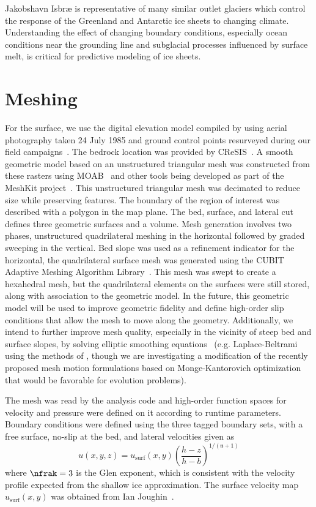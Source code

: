 Jakobshavn Isbr{\ae} is representative of many similar outlet glaciers which control the response of the Greenland and Antarctic ice sheets to changing climate.
Understanding the effect of changing boundary conditions, especially ocean conditions near the grounding line and subglacial processes influenced by surface melt, is critical for predictive modeling of ice sheets.


\section{Meshing}
For the surface, we use the digital elevation model compiled by \cite{motyka2010volume} using aerial photography taken 24 July 1985 and ground control points resurveyed during our field campaigns~.
The bedrock location was provided by CReSIS~.
A smooth geometric model based on an unstructured triangular mesh was constructed from these rasters using MOAB~\cite{moab} and other tools being developed as part of the MeshKit project~\cite{meshkit}.
This unstructured triangular mesh was decimated to reduce size while preserving features.
The boundary of the region of interest was described with a polygon in the map plane.
The bed, surface, and lateral cut defines three geometric surfaces and a volume.
Mesh generation involves two phases, unstructured quadrilateral meshing in the horizontal followed by graded sweeping in the vertical.
Bed slope was used as a refinement indicator for the horizontal, the quadrilateral surface mesh was generated using the CUBIT Adaptive Meshing Algorithm Library~\cite{blacker1994cmg}.
This mesh was swept to create a hexahedral mesh, but the quadrilateral elements on the surfaces were still stored, along with association to the geometric model.
In the future, this geometric model will be used to improve geometric fidelity and define high-order slip conditions that allow the mesh to move along the geometry.
Additionally, we intend to further improve mesh quality, especially in the vicinity of steep bed and surface slopes, by solving elliptic smoothing equations~\cite{liseikin2009grid} (e.g. Laplace-Beltrami using the methods of \cite{hansen2007unstructured,berndt2008efficient}, though we are investigating a modification of the recently proposed mesh motion formulations based on Monge-Kantorovich optimization~\cite{delzanno2008optimal,chacon2011robust} that would be favorable for evolution problems).

The mesh was read by the analysis code and high-order function spaces for velocity and pressure were defined on it according to runtime parameters.
Boundary conditions were defined using the three tagged boundary sets, with a free surface, no-slip at the bed, and lateral velocities given as
\begin{equation}\label{eq:surfacevel}
  u(x,y,z) = u_{\text{surf}}(x,y) \left( \frac{h-z}{h-b} \right)^{1/(\mathfrak n+1)}
\end{equation}
where $\nfrak = 3$ is the Glen exponent, which is consistent with the velocity profile expected from the shallow ice approximation.
The surface velocity map $u_{\text{surf}}(x,y)$ was obtained from Ian Joughin~.



